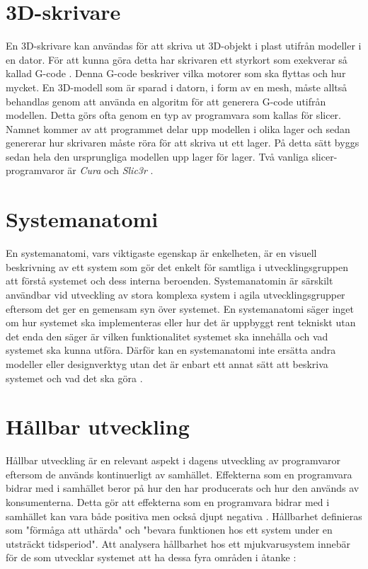\section{3D-skrivare}
En 3D-skrivare kan användas för att skriva ut 3D-objekt i plast utifrån modeller i en dator. För att kunna göra detta har skrivaren ett styrkort som exekverar så kallad G-code \cite{gcode}. Denna G-code beskriver vilka motorer som ska flyttas och hur mycket. En 3D-modell som är sparad i datorn, i form av en mesh, måste alltså behandlas genom att använda en algoritm för att generera G-code utifrån modellen. Detta görs ofta genom en typ av programvara som kallas för slicer. Namnet kommer av att programmet delar upp modellen i olika lager och sedan genererar hur skrivaren måste röra för att skriva ut ett lager. På detta sätt byggs sedan hela den ursprungliga modellen upp lager för lager. Två vanliga slicer-programvaror är \textit{Cura} \cite{cura} och \textit{Slic3r} \cite{slic3r}.

\section{Systemanatomi}
En systemanatomi, vars viktigaste egenskap är enkelheten, är en visuell beskrivning av ett system som gör det enkelt för samtliga i utvecklingsgruppen att förstå systemet och dess interna beroenden. Systemanatomin är särskilt användbar vid utveckling av stora komplexa system i agila utvecklingsgrupper eftersom det ger en gemensam syn över systemet. En systemanatomi säger inget om hur systemet ska implementeras eller hur det är uppbyggt rent tekniskt utan det enda den säger är vilken funktionalitet systemet ska innehålla och vad systemet ska kunna utföra. Därför kan en systemanatomi inte ersätta andra modeller eller designverktyg utan det är enbart ett annat sätt att beskriva systemet och vad det ska göra \cite{system_anatomy}.


\section{Hållbar utveckling}
Hållbar utveckling är en relevant aspekt i dagens utveckling av programvaror eftersom de används kontinuerligt av samhället. Effekterna som en programvara bidrar med i samhället beror på hur den har producerats och hur den används av konsumenterna. Detta gör att effekterna som en programvara bidrar med i samhället kan vara både positiva men också djupt negativa \cite{raturi2014developing}. Hållbarhet definieras som "förmåga att uthärda" och "bevara funktionen hos ett system under en utsträckt tidsperiod". Att analysera hållbarhet hos ett mjukvarusystem innebär för de som utvecklar systemet att ha dessa fyra områden i åtanke \cite{lago2015framing}:

